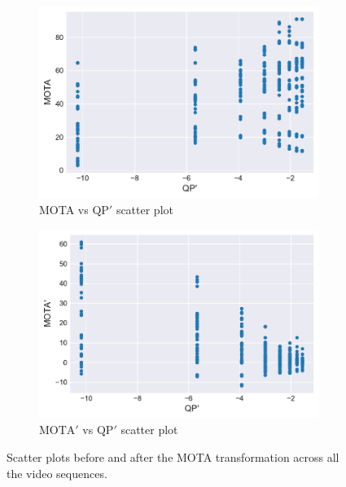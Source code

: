 

\begin{figure}[!tb]
  \centering
  \begin{subfigure}{.5\linewidth}
    \centering
    \includegraphics[width=\linewidth]{img/MOTA_transformation_before.pdf}
    \caption{MOTA vs $\text{QP}'$ scatter plot}
    \label{fig:MOTA_transformation_before}
  \end{subfigure}%
  \begin{subfigure}{.5\linewidth}
    \centering
    \includegraphics[width=\linewidth]{img/MOTA_transformation_after.pdf}
    \caption{$\text{MOTA}'$ vs $\text{QP}'$ scatter plot }
    \label{fig:MOTA_transformation_after}
  \end{subfigure}
  \caption[Scatter plots before and after the MOTA transformation on all the video sequences]{%
    Scatter plots before and after the MOTA transformation across all the video sequences.%
  }
  \label{fig:MOTA_transformation}
\end{figure}
